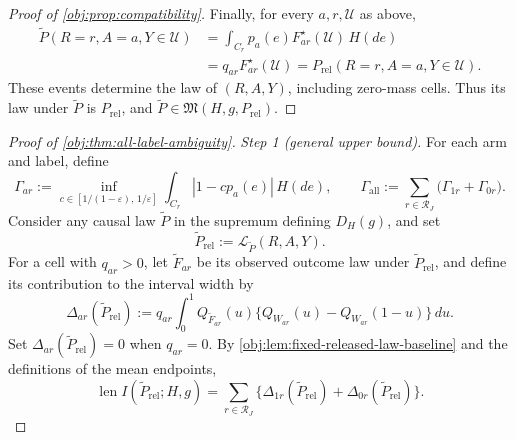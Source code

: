 \begin{proof}[Proof of \cref{obj:prop:compatibility}]
Finally, for every \(a,r,\mathcal U\) as above,
\[
\begin{aligned}
\widetilde P(R=r,A=a,Y\in\mathcal U)
&=\int_{C_r}p_a(e)F^\star_{ar}(\mathcal U)\,H(de)\\
&=q_{ar}F^\star_{ar}(\mathcal U)
=P_{\mathrm{rel}}(R=r,A=a,Y\in\mathcal U).
\end{aligned}
\]
These events determine the law of \((R,A,Y)\), including zero-mass cells. Thus its law under \(\widetilde P\) is \(P_{\mathrm{rel}}\), and \(\widetilde P\in\mathfrak M(H,g,P_{\mathrm{rel}})\).
\end{proof}

\begin{proof}[Proof of \cref{obj:thm:all-label-ambiguity}]
\textit{Step 1 (general upper bound).}
For each arm and label, define
\[
\Gamma_{ar}
:=\inf_{c\in[1/(1-\varepsilon),\,1/\varepsilon]}
       \int_{C_r}|1-cp_a(e)|\,H(de),
\qquad
\Gamma_{\mathrm{all}}:=\sum_{r\in\mathcal R_J}
       \bigl(\Gamma_{1r}+\Gamma_{0r}\bigr).
\]
Consider any causal law \(\widetilde P\) in the supremum defining \(D_H(g)\), and set
\[
\widetilde P_{\mathrm{rel}}
:=\mathcal L_{\widetilde P}(R,A,Y).
\]
For a cell with \(q_{ar}>0\), let \(\widetilde F_{ar}\) be its observed outcome law under \(\widetilde P_{\mathrm{rel}}\), and define its contribution to the interval width by
\[
\Delta_{ar}(\widetilde P_{\mathrm{rel}})
:=q_{ar}\int_0^1 Q_{\widetilde F_{ar}}(u)
       \bigl\{Q_{W_{ar}}(u)-Q_{W_{ar}}(1-u)\bigr\}\,du.
\]
Set \(\Delta_{ar}(\widetilde P_{\mathrm{rel}})=0\) when \(q_{ar}=0\). By \cref{obj:lem:fixed-released-law-baseline} and the definitions of the mean endpoints,
\[
\operatorname{len}I(\widetilde P_{\mathrm{rel}};H,g)
=\sum_{r\in\mathcal R_J}
 \bigl\{\Delta_{1r}(\widetilde P_{\mathrm{rel}})
       +\Delta_{0r}(\widetilde P_{\mathrm{rel}})\bigr\}.
\]


\end{proof}
